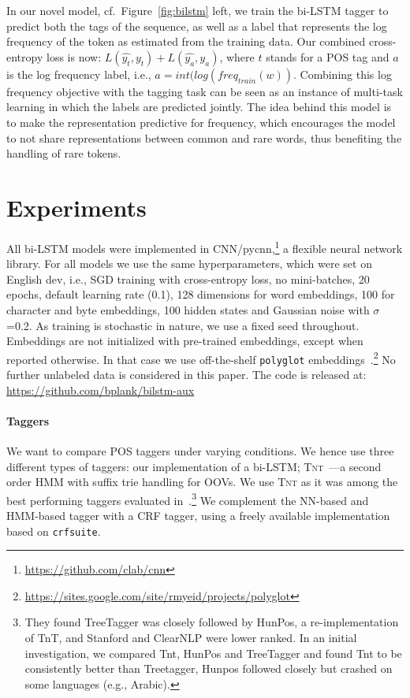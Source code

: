 \documentclass[11pt]{article}
\begin{document}
In our novel model, cf.\ Figure~\ref{fig:bilstm} left, we train the bi-LSTM tagger to predict both the tags of the sequence, as well as a label that represents the  log frequency of the token as estimated from the training data. Our combined cross-entropy loss is now: $L(\hat{y_t},y_t) + L(\hat{y_{a}},y_{a})$, where $t$ stands for a POS tag and $a$ is the log frequency label, i.e., $a=int(log(freq_{train}(w))$.
 Combining this log frequency objective with the tagging task can be seen as an instance of multi-task learning in which the labels are predicted jointly. 
The idea behind this model is to make the representation predictive for frequency, which encourages the model to not share representations between common and rare words, thus benefiting the handling of rare tokens.

 
\section{Experiments} 
All bi-LSTM models were implemented in CNN/pycnn,\footnote{\url{https://github.com/clab/cnn}} a flexible neural network library. For all models we use the same hyperparameters, which were set on English dev, i.e., SGD training with cross-entropy loss, no mini-batches, 20 epochs, default learning rate (0.1), 128 dimensions for word embeddings, 100 for character and byte embeddings, 100 hidden states and Gaussian noise with $\sigma$=0.2. As training is stochastic in nature, we use a fixed seed throughout. Embeddings are not initialized with pre-trained embeddings, except when reported otherwise. In that case we use off-the-shelf \texttt{polyglot} embeddings~\cite{polyglot:2013}.\footnote{\url{https://sites.google.com/site/rmyeid/projects/polyglot}} No further unlabeled data is considered in this paper. The code is released at: \url{https://github.com/bplank/bilstm-aux} 

\paragraph{Taggers} We want to compare POS taggers under varying conditions. We hence use three different types of taggers: our implementation of a bi-LSTM; \textsc{Tnt}~\cite{brants2000tnt}---a second order HMM with suffix trie handling for OOVs. We use \textsc{Tnt} as it was among the best performing taggers evaluated in~.\footnote{They found TreeTagger was closely followed by HunPos, a re-implementation of TnT, and Stanford  and ClearNLP were lower ranked. In an initial investigation, we compared Tnt, HunPos and TreeTagger and found Tnt to be consistently better than Treetagger, Hunpos followed closely but crashed on some languages (e.g., Arabic).} We complement the NN-based and HMM-based tagger with a CRF tagger, using a freely available implementation~\cite{Plank:ea:14:coling} based on \texttt{crfsuite}. 
\end{document}
